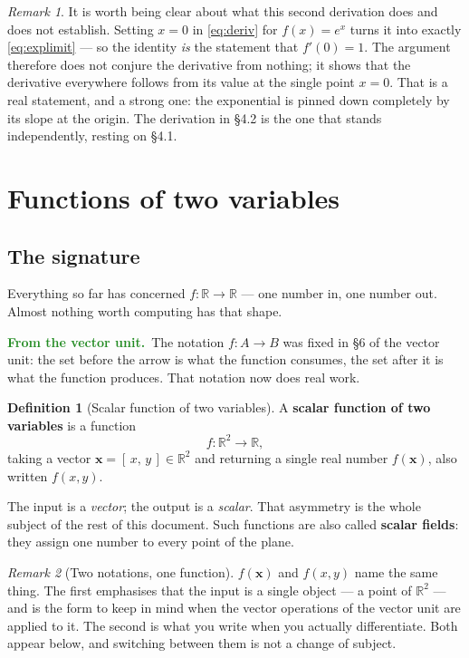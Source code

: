 \documentclass[11pt]{article}
\theoremstyle{plain}
\theoremstyle{definition}
\newtheorem{defn}{Definition}[section]
\theoremstyle{remark}
\newtheorem*{rmk}{Remark}
\newcommand{\lookback}{\par\smallskip\noindent
  \textbf{\sffamily\textcolor{ForestGreen}{From the vector unit.}}\ \ignorespaces}
\newcommand{\R}{\mathbb{R}}
\newcommand{\vc}[1]{\mathbf{#1}}
\begin{document}
\begin{rmk}
It is worth being clear about what this second derivation does and does not
establish. Setting $x=0$ in \eqref{eq:deriv} for $f(x)=e^{x}$ turns it into
exactly \eqref{eq:explimit} --- so the identity \emph{is} the statement that
$f'(0)=1$. The argument therefore does not conjure the derivative from nothing;
it shows that the derivative everywhere follows from its value at the single
point $x=0$. That is a real statement, and a strong one: the exponential is
pinned down completely by its slope at the origin. The derivation in \S4.2 is
the one that stands independently, resting on \S4.1.
\end{rmk}

\section{Functions of two variables}

\subsection{The signature}
Everything so far has concerned $f:\R\to\R$ --- one number in, one number out.
Almost nothing worth computing has that shape.

\lookback The notation $f:A\to B$ was fixed in \S6 of the vector unit: the set
before the arrow is what the function consumes, the set after it is what the
function produces. That notation now does real work.

\begin{defn}[Scalar function of two variables]
A \textbf{scalar function of two variables} is a function
\[
  f:\R^{2}\longrightarrow\R ,
\]
taking a vector $\vc{x}=[\,x,\,y\,]\in\R^{2}$ and returning a single real number
$f(\vc{x})$, also written $f(x,y)$.
\end{defn}

\noindent The input is a \emph{vector}; the output is a \emph{scalar}. That
asymmetry is the whole subject of the rest of this document. Such functions are
also called \textbf{scalar fields}: they assign one number to every point of the
plane.

\begin{rmk}[Two notations, one function]
$f(\vc{x})$ and $f(x,y)$ name the same thing. The first emphasises that the
input is a single object --- a point of $\R^{2}$ --- and is the form to keep in
mind when the vector operations of the vector unit are applied to it. The second
is what you write when you actually differentiate. Both appear below, and
switching between them is not a change of subject.
\end{rmk}
\end{document}
